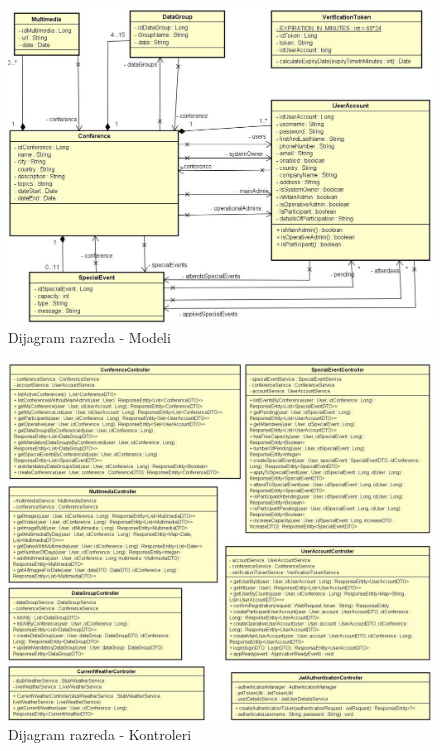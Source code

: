			\newpage

			\begin{figure}[H]
			\includegraphics[width=\textwidth]{slike/Model diagram.jpg}
			\centering
			\caption{Dijagram razreda - Modeli}
			\label{fig:dijagram_razreda_modeli}
			\end{figure}
			
			\newpage


			\begin{figure}[H]
			\includegraphics[width=\textwidth]{slike/Controller Dijagram.jpg}
			\centering
			\caption{Dijagram razreda - Kontroleri}
			\label{fig:dijagram_razreda_kontroleri}
			\end{figure}
			
